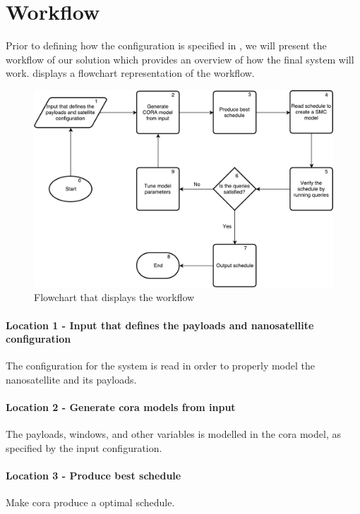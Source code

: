 \section{Workflow} \label{subsec:tool_chainv}
Prior to defining how the configuration is specified in , we will present the workflow of our solution which provides an overview of how the final system will work.
 displays a flowchart representation of the workflow.

\begin{figure}[h]
	\includegraphics[width=\textwidth]{graphics/flow_final.pdf}
	\caption{Flowchart that displays the workflow}
	\label{fig:tool1}
\end{figure}

\paragraph{Location 1 - Input that defines the payloads and nanosatellite configuration} 
The configuration for the system is read in order to properly model the nanosatellite and its payloads.

\paragraph{Location 2 - Generate \gls{cora} models from input} 
The payloads, windows, and other variables is modelled in the \gls{cora} model, as specified by the input configuration.

\paragraph{Location 3 - Produce best schedule} 
Make \gls{cora}  produce a optimal schedule.

